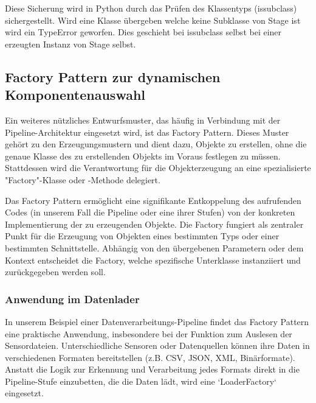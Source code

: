 \documentclass[11pt, a4paper]{article}
\begin{document}
Diese Sicherung wird in Python durch das Prüfen des Klassentyps (issubclass) sichergestellt. Wird eine Klasse übergeben welche keine Subklasse von Stage ist wird ein TypeError geworfen. Dies geschieht bei issubclass selbst bei einer erzeugten Instanz von Stage selbst.

\subsection{Factory Pattern zur dynamischen Komponentenauswahl}
Ein weiteres nützliches Entwurfsmuster, das häufig in Verbindung mit der Pipeline-Architektur eingesetzt wird, ist das Factory Pattern. Dieses Muster gehört zu den Erzeugungsmustern und dient dazu, Objekte zu erstellen, ohne die genaue Klasse des zu erstellenden Objekts im Voraus festlegen zu müssen. Stattdessen wird die Verantwortung für die Objekterzeugung an eine spezialisierte "Factory"-Klasse oder -Methode delegiert.

Das Factory Pattern ermöglicht eine signifikante Entkoppelung des aufrufenden Codes (in unserem Fall die Pipeline oder eine ihrer Stufen) von der konkreten Implementierung der zu erzeugenden Objekte. Die Factory fungiert als zentraler Punkt für die Erzeugung von Objekten eines bestimmten Typs oder einer bestimmten Schnittstelle. Abhängig von den übergebenen Parametern oder dem Kontext entscheidet die Factory, welche spezifische Unterklasse instanziiert und zurückgegeben werden soll.

\subsubsection{Anwendung im Datenlader}
In unserem Beispiel einer Datenverarbeitungs-Pipeline findet das Factory Pattern eine praktische Anwendung, insbesondere bei der Funktion zum Auslesen der Sensordateien. Unterschiedliche Sensoren oder Datenquellen können ihre Daten in verschiedenen Formaten bereitstellen (z.B. CSV, JSON, XML, Binärformate). Anstatt die Logik zur Erkennung und Verarbeitung jedes Formats direkt in die Pipeline-Stufe einzubetten, die die Daten lädt, wird eine `LoaderFactory` eingesetzt.
\end{document}
